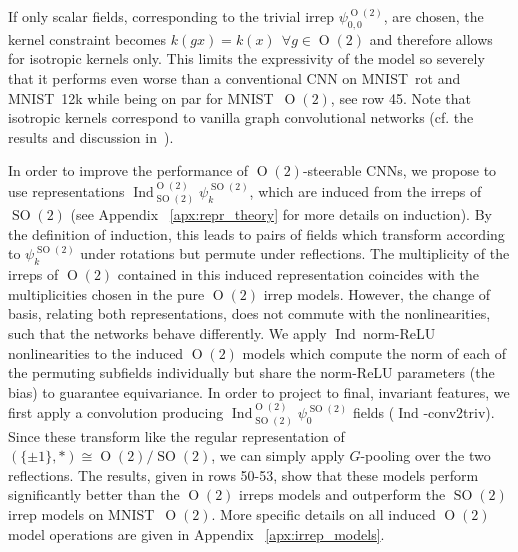 \documentclass{article}
\newcommand{\apx}{Appendix\xspace
}
\renewcommand{\O}[1]{\ensuremath{\operatorname{O}(#1)}}
\newcommand{\SO}[1]{\ensuremath{\operatorname{SO}(#1)}}
\newcommand{\Flip}{(\{\pm 1\}, *)}
\newcommand{\Ind}[2]{\ensuremath{\operatorname{Ind}_{#1}^{#2}}}
\begin{document}
If only scalar fields, corresponding to the trivial irrep $\psi_{0,0}^{\O2}$, are chosen, the kernel constraint becomes $k(gx)=k(x)\ \ \forall g\in\O2$ and therefore allows for isotropic kernels only.
This limits the expressivity of the model so severely that it performs even worse than a conventional CNN on MNIST~rot and MNIST~12k while being on par for MNIST~$\O2$, see row 45.
Note that isotropic kernels correspond to vanilla graph convolutional networks (cf. the results and discussion in~\cite{gauge}).

In order to improve the performance of $\O2$-steerable CNNs, we propose to use representations $\Ind{\SO2}{\O2}\psi_k^{\SO2}$, which are induced from the irreps of $\SO2$ (see \apx~\ref{apx:repr_theory} for more details on induction).
By the definition of induction, this leads to pairs of fields which transform according to $\psi_k^{\SO2}$ under rotations but permute under reflections.
The multiplicity of the irreps of $\O2$ contained in this induced representation coincides with the multiplicities chosen in the pure $\O2$ irrep models.
However, the change of basis, relating both representations, does not commute with the nonlinearities, such that the networks behave differently.
We apply $\Ind{}{}\,$norm-ReLU nonlinearities to the induced $\O2$ models which compute the norm of each of the permuting subfields individually but share the norm-ReLU parameters (the bias) to guarantee equivariance.
In order to project to final, invariant features, we first apply a convolution producing $\Ind{\SO2}{\O2}\psi_0^{\SO2}$ fields ($\Ind{}{}$-conv2triv).
Since these transform like the regular representation of $\Flip\cong\O2/\SO2$, we can simply apply $G$-pooling over the two reflections.
The results, given in rows 50-53, show that these models perform significantly better than the $\O2$ irreps models and outperform the $\SO2$ irrep models on MNIST~$\O2$.
More specific details on all induced $\O2$ model operations are given in \apx~\ref{apx:irrep_models}.
\end{document}
